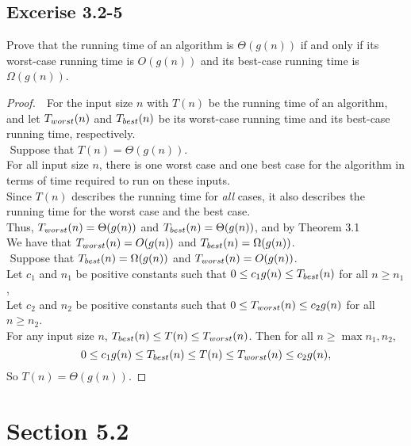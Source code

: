 \documentclass{article}
\begin{document}
\subsection*{Excerise 3.2-5}
Prove that the running time of an algorithm is $ \Theta(g(n)) $ if and only if its worst-case
running time is $ O(g(n)) $ and its best-case running time is $ \Omega(g(n)) $.
\begin{proof}
    $ $\newline
    $ $\newline
    For the input size $n$ with $T(n)$ be the running time of an algorithm, 
    and let $T_{worst}(n)$ and $T_{best}(n)$ be its worst-case running time and its best-case running time, respectively. \\
    $ $\newline
    Suppose that $T(n)=\Theta(g(n))$. \\
    For all input size $n$, there is one worst case and one best case for the algorithm 
    in terms of time required to run on these inputs. \\
    Since $T(n)$ describes the running time for \emph{all} cases, it also describes the 
    running time for the worst case and the best case. \\
    Thus, $T_{worst}(n)=\Theta(g(n))$ and $T_{best}(n)=\Theta(g(n))$, and by Theorem 3.1 \\
    We have that $T_{worst}(n)=O(g(n))$ and $T_{best}(n)=\Omega(g(n))$. \\
    $ $\newline
    Suppose that $T_{best}(n)=\Omega(g(n))$ and $T_{worst}(n)=O(g(n))$. \\
    Let $c_1$ and $n_1$ be positive constants such that $0\le c_1g(n)\le T_{best}(n)$ for all $n\ge n_1$, \\
    Let $c_2$ and $n_2$ be positive constants such that $0\le T_{worst}(n)\le c_2g(n)$ for all $n\ge n_2$. \\
    For any input size $n$, $T_{best}(n)\le T(n)\le T_{worst}(n)$.
    Then for all $n\ge\max{n_1,n_2}$,
    \[
        0 \le c_1g(n) \le T_{best}(n) \le T(n) \le T_{worst}(n) \le c_2g(n),
    \]
    So $T(n)=\Theta(g(n))$.
\end{proof}

\clearpage %

\section*{Section 5.2}
\end{document}
